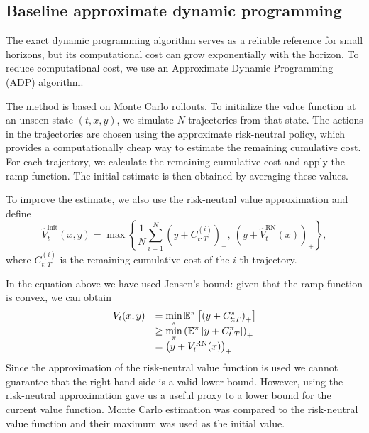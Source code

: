 \subsection{Baseline approximate dynamic programming}
\label{method:baseline-adp}

The exact dynamic programming algorithm serves as a reliable reference for small horizons, but its computational cost can grow exponentially with the horizon. To reduce computational cost, we use an Approximate Dynamic Programming (ADP) algorithm.

The method is based on Monte Carlo rollouts. To initialize the value function at an unseen state $(t,x,y)$, we simulate $N$ trajectories from that state. The actions in the trajectories are chosen using the approximate risk-neutral policy, which provides a computationally cheap way to estimate the remaining cumulative cost. For each trajectory, we calculate the remaining cumulative cost and apply the ramp function. The initial estimate is then obtained by averaging these values.

To improve the estimate, we also use the risk-neutral value approximation and define
\begin{equation}
	\hat{V}_t^{\text{init}}(x,y) = \max\left\{
	\frac{1}{N}\sum_{i=1}^N (y+C_{t:T}^{(i)})_+,\ 
	\left(y+\hat{V}_t^{\text{RN}}(x)\right)_+
	\right\},
	\label{value-initializer}
\end{equation}
where $C_{t:T}^{(i)}$ is the remaining cumulative cost of the $i$-th trajectory.

In the equation above we have used Jensen's bound: given that the ramp function is convex, we can obtain
\begin{equation}
	\begin{array}{rl}
		V_t(x, y) & \displaystyle = \min_{\pi} \mathbb{E}^{\pi} \left[ \left( y + C_{t:T}^{\pi} \right)_+ \right] \\
		& \displaystyle \geq \min_{\pi} \left( \mathbb{E}^{\pi} \left[ y + C_{t:T}^{\pi} \right] \right)_+ \\
		& = \left( y + V_t^{\text{RN}} (x) \right)_+
	\end{array}
	\notag
	\label{value-jensen}
\end{equation}
Since the approximation of the risk-neutral value function is used we cannot guarantee that the right-hand side is a valid lower bound. However, using the risk-neutral approximation gave us a useful proxy to a lower bound for the current value function. Monte Carlo estimation was compared to the risk-neutral value function and their maximum was used as the initial value.

